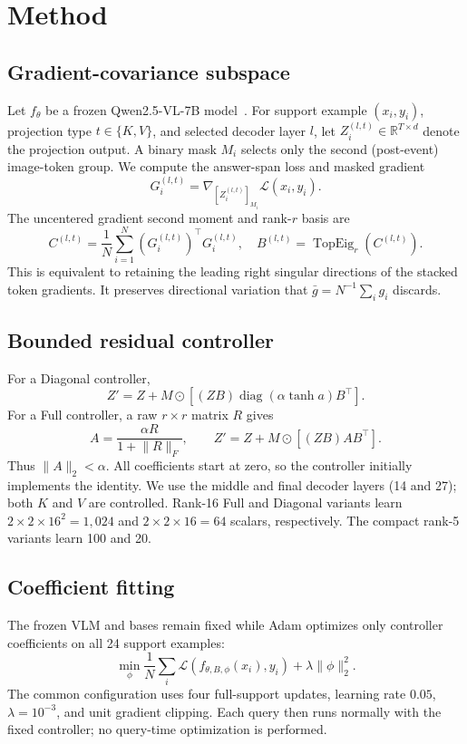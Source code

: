 \documentclass[conference]{IEEEtran}
\begin{document}
\section{Method}
\subsection{Gradient-covariance subspace}
Let $f_\theta$ be a frozen Qwen2.5-VL-7B model~\cite{qwen2_5vl}. For support
example $(x_i,y_i)$, projection type $t\in\{K,V\}$, and selected decoder layer
$l$, let $Z_i^{(l,t)}\in\mathbb{R}^{T\times d}$ denote the projection output.
A binary mask $M_i$ selects only the second (post-event) image-token group. We
compute the answer-span loss and masked gradient
\begin{equation}
G_i^{(l,t)}=\nabla_{[Z_i^{(l,t)}]_{M_i}}\mathcal{L}(x_i,y_i).
\end{equation}
The uncentered gradient second moment and rank-$r$ basis are
\begin{equation}
C^{(l,t)}=\frac{1}{N}\sum_{i=1}^{N}(G_i^{(l,t)})^\top G_i^{(l,t)},\quad
B^{(l,t)}=\operatorname{TopEig}_r(C^{(l,t)}).
\end{equation}
This is equivalent to retaining the leading right singular directions of the
stacked token gradients. It preserves directional variation that
$\bar g=N^{-1}\sum_i g_i$ discards.

\subsection{Bounded residual controller}
For a Diagonal controller,
\begin{equation}
Z'=Z+M\odot\left[(ZB)\operatorname{diag}(\alpha\tanh a)B^\top\right].
\end{equation}
For a Full controller, a raw $r\times r$ matrix $R$ gives
\begin{equation}
A=\frac{\alpha R}{1+\lVert R\rVert_F},\qquad
Z'=Z+M\odot\left[(ZB)AB^\top\right].
\end{equation}
Thus $\lVert A\rVert_2<\alpha$. All coefficients start at zero, so the
controller initially implements the identity. We use the middle and final
decoder layers (14 and 27); both $K$ and $V$ are controlled. Rank-16 Full and
Diagonal variants learn $2\times2\times16^2=1{,}024$ and
$2\times2\times16=64$ scalars, respectively. The compact rank-5 variants learn
100 and 20.

\subsection{Coefficient fitting}
The frozen VLM and bases remain fixed while Adam optimizes only controller
coefficients on all 24 support examples:
\begin{equation}
\min_\phi\frac{1}{N}\sum_i\mathcal{L}(f_{\theta,B,\phi}(x_i),y_i)
+\lambda\lVert\phi\rVert_2^2.
\end{equation}
The common configuration uses four full-support updates, learning rate $0.05$,
$\lambda=10^{-3}$, and unit gradient clipping. Each query then runs normally
with the fixed controller; no query-time optimization is performed.
\end{document}
